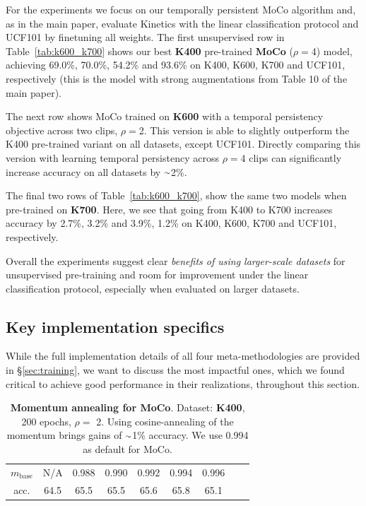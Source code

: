 \documentclass[final]{cvpr}
\newcommand{\tblref}[1]{Table~\ref{#1}}
\newcommand{\app}{\raise.17ex\hbox{$\scriptstyle\sim$}}
\newcommand{\tablestyle}[2]{\setlength{\tabcolsep}{#1}\renewcommand{\arraystretch}{#2}\centering\footnotesize}
\begin{document}
For the experiments we focus on our temporally persistent MoCo algorithm and, as in the main paper, evaluate Kinetics with the linear classification protocol and UCF101 by finetuning all weights.  
The first unsupervised row in \tblref{tab:k600_k700} shows our best \textbf{K400} pre-trained \textbf{MoCo} ($\rho{=}$4) model, achieving 69.0\%, 70.0\%, 54.2\% and 93.6\% on K400, K600, K700 and UCF101, respectively (this is the model with strong augmentations from Table {\color{red}10} of the main paper). 

The next row shows MoCo trained on \textbf{K600} with a temporal persistency objective across two clips, $\rho{=}$2. This version is able to slightly outperform the K400 pre-trained variant on all datasets, except UCF101. Directly comparing this version with learning temporal persistency across $\rho{=}$4  clips can significantly increase accuracy on all datasets by $\app$2\%. 

The final two rows of \tblref{tab:k600_k700}, show the same two models when pre-trained on \textbf{K700}. Here, we see that going from K400 to K700 increases accuracy by  2.7\%, 3.2\% and 3.9\%, 1.2\% on K400, K600, K700 and UCF101, respectively.

Overall the experiments suggest clear \textit{benefits of using larger-scale datasets} for unsupervised pre-training and room for improvement under the linear classification protocol, especially when evaluated on larger datasets.

\subsection{Key implementation specifics} \label{sec:results_impl}
While the full implementation details of all four meta-methodologies are provided in \S\ref{sec:training}, we want to discuss the most impactful ones, which we found critical to achieve good performance in their realizations, throughout this section.  


\begin{table}[h!] 
	\centering
	\tablestyle{3pt}{1.05} 
	\tablestyle{6.4pt}{1.0}	
	\begin{tabular}{ccccccccc}
		$m_\text{base}$ & N/A & 0.988 & 0.990 & 0.992  & 0.994 & 0.996 \\
		\shline
		acc. & 64.5 & 65.5  & 65.5 & 65.6 & 65.8 & 65.1 \\
	\end{tabular}
	\vspace{.3em}
	\caption{\textbf{Momentum annealing for MoCo}. Dataset: \textbf{K400}, 200 epochs, $\rho{=}$ 2. Using cosine-annealing of the momentum brings gains of $\app$1\% accuracy. We use 0.994 as default for MoCo. }
	\label{tab:mom_moco} \vspace{-10pt}
\end{table}
\end{document}
